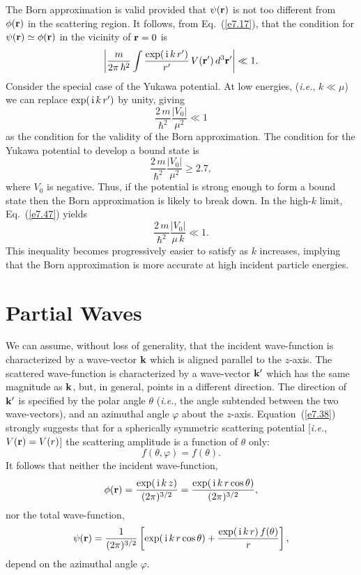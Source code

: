 The Born approximation is valid provided that $\psi({\bf r})$ is
not too different from $\phi({\bf r})$ in the scattering region. 
It follows, from Eq.~(\ref{e7.17}), that the condition for  $\psi({\bf r})
\simeq \phi({\bf r})$ in the vicinity of ${\bf r} = 0$ is 
\begin{equation}\label{e7.47}
\left| \frac{m}{2\pi\, \hbar^2} \int \frac{ \exp(\,{\rm i}\, k \,r')}{r'} 
\,V({\bf r}')\,d^3{\bf r'} \right| \ll 1.
\end{equation}
 Consider the special case of the Yukawa potential. At low energies,
({\em i.e.}, $k\ll \mu$) we can replace $\exp(\,{\rm i}\,k\, r')$ by unity,
giving
\begin{equation}
\frac{2\,m}{\hbar^2} \frac{|V_0|}{\mu^2} \ll 1
\end{equation}
as the condition for the validity of the Born approximation.
The condition for the Yukawa potential to develop a bound state
is
\begin{equation}
\frac{2\,m}{\hbar^2} \frac{|V_0|} {\mu^2} \geq 2.7,
\end{equation}
where $V_0$ is negative. Thus, if the potential is strong enough to
form a bound state then the Born approximation is likely to break
down. In the high-$k$ limit, Eq.~(\ref{e7.47}) yields
\begin{equation}
\frac{2\,m}{\hbar^2} \frac{|V_0|}{\mu \,k} \ll 1.
\end{equation}
This inequality becomes progressively easier to satisfy as $k$ increases,
implying that the Born approximation is more accurate at high
incident particle energies.

\section{Partial Waves}
We can assume, without loss of generality, that the incident wave-function
is characterized by  a wave-vector ${\bf k}$ which is aligned parallel to the $z$-axis.
The scattered wave-function is characterized by a wave-vector ${\bf k}'$
which has the same magnitude as ${\bf k}$, but, in general, points
in a different direction. The direction of ${\bf k}'$ is specified
by the polar angle $\theta$ ({\em i.e.}, the angle subtended between the
two wave-vectors), and an azimuthal angle $\varphi$ about the $z$-axis.
Equation~(\ref{e7.38}) strongly suggests that for a spherically symmetric
scattering potential [{\em i.e.}, $V({\bf r}) = V(r)$] the scattering amplitude
is a function of $\theta$ only:
\begin{equation}
f(\theta, \varphi) = f(\theta).
\end{equation}
It follows that neither the incident wave-function,
\begin{equation}\label{e7.52}
\phi({\bf r}) = \frac{\exp(\,{\rm i}\,k\,z)}{(2\pi)^{3/2}}= \frac{\exp(\,{\rm i}\,k\,r\cos\theta)}{(2\pi)^{3/2}},
\end{equation}
nor the total wave-function,
\begin{equation}\label{e7.53}
\psi({\bf r})  = \frac{1}{(2\pi)^{3/2}}
\left[ \exp(\,{\rm i}\,k\,r\cos\theta) + \frac{\exp(\,{\rm i}\,k\,r)\, f(\theta)}
{r} \right],
\end{equation}
depend on the azimuthal angle $\varphi$. 

